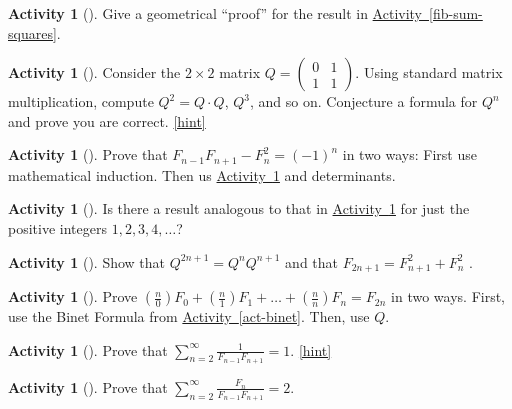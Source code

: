 \documentclass[10pt,]{book}
\theoremstyle{plain}
\theoremstyle{definition}
\theoremstyle{definition}
\theoremstyle{definition}
\newtheorem{activity}[project]{Activity}
\numberwithin{equation}{chapter}
\newcommand{\amp}{&}
\begin{document}
\begin{activity}[]\label{activity-148}
\hypertarget{p-967}{}%
Give a geometrical ``proof'' for the result in \hyperref[fib-sum-squares]{Activity~\ref{fib-sum-squares}}.%
\end{activity}
\begin{activity}[]\label{fib-matrix}
\hypertarget{p-968}{}%
Consider the \(2\times 2\) matrix \(Q =
\begin{pmatrix}
0 \amp 1\\
1 \amp 1
\end{pmatrix}.\) Using standard matrix multiplication, compute \(Q^2 = Q\cdot Q\), \(Q^3\), and so on.  Conjecture a formula for \(Q^n\) and prove you are correct.%
\hfill{\tiny\hyperlink{a-156}{[hint]}\hypertarget{q-156}{}}\end{activity}
\begin{activity}[]\label{fib-neg-one}
\hypertarget{p-970}{}%
Prove that \(F_{n - 1}F_{n + 1} - F_{n}^{2} = (-1)^{n}\) in two ways:  First use mathematical induction.  Then us \hyperref[fib-matrix]{Activity~\ref{fib-matrix}} and determinants.%
\end{activity}
\begin{activity}[]\label{activity-151}
\hypertarget{p-971}{}%
Is there a result analogous to that in \hyperref[fib-neg-one]{Activity~\ref{fib-neg-one}} for just the positive integers \(1, 2, 3, 4, \ldots\)?%
\end{activity}
\begin{activity}[]\label{activity-152}
\hypertarget{p-972}{}%
Show that \(Q^{2n + 1} = Q^{n}Q^{n+1}\) and that \(F_{2n + 1} = F_{n + 1}^{2} + F_{n}^{2}\) .%
\end{activity}
\begin{activity}[]\label{activity-153}
\hypertarget{p-973}{}%
Prove \(\left( \frac{n}{0} \right)F_{0} + \left( \frac{n}{1} \right)F_{1} + \ldots + \left( \frac{n}{n} \right)F_{n} = F_{2n}\) in two ways.  First, use the Binet Formula from \hyperref[act-binet]{Activity~\ref{act-binet}}.  Then, use \(Q\).%
\end{activity}
\begin{activity}[]\label{activity-154}
\hypertarget{p-974}{}%
Prove that \(\sum_{n = 2}^{\infty}\frac{1}{F_{n - 1}F_{n + 1}} = 1\).%
\hfill{\tiny\hyperlink{a-161}{[hint]}\hypertarget{q-161}{}}\end{activity}
\begin{activity}[]\label{activity-155}
\hypertarget{p-976}{}%
Prove that \(\sum_{n = 2}^{\infty}\frac{F_{n}}{F_{n - 1}F_{n + 1}} = 2.\)%
\end{activity}
\end{document}
